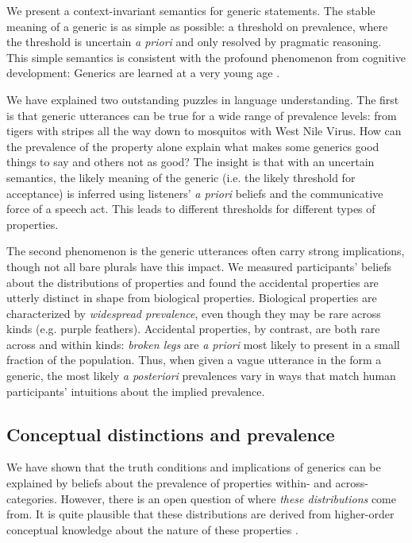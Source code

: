\documentclass[10pt,letterpaper]{article}
\begin{document}

We present a context-invariant semantics for generic statements. 
The stable meaning of a generic is as simple as possible: a threshold on prevalence, where the threshold is uncertain \emph{a priori} and only resolved by pragmatic reasoning.
This simple semantics is consistent with the profound phenomenon from cognitive development: Generics are learned at a very young age \cite{Gelman1998, Gelman2004, Gelman2008, Cimpian2008}.

We have explained two outstanding puzzles in language understanding. 
The first is that generic utterances can be true for a wide range of prevalence levels: from tigers with stripes all the way down to mosquitos with West Nile Virus. 
How can the prevalence of the property alone explain what makes some generics good things to say and others not as good? 
The insight is that with an uncertain semantics, the likely meaning of the generic (i.e. the likely threshold for acceptance) is inferred using listeners' \emph{a priori} beliefs and the communicative force of a speech act. 
This leads to different thresholds for different types of properties. 

The second phenomenon is the generic utterances often carry strong implications, though not all bare plurals have this impact. 
We measured participants' beliefs about the distributions of properties and found the accidental properties are utterly distinct in shape from biological properties.
Biological properties are characterized by \emph{widespread prevalence}, even though they may be rare across kinds (e.g. purple feathers).
Accidental properties, by contrast, are both rare across and within kinds: \emph{broken legs} are \emph{a priori} most likely to present in a small fraction of the population.
Thus, when given a vague utterance in the form a generic, the most likely \emph{a posteriori} prevalences vary in ways that match human participants' intuitions about the implied prevalence.


\subsection{Conceptual distinctions and prevalence}

We have shown that the truth conditions and implications of generics can be explained by beliefs about the prevalence of properties within- and across- categories. 
However, there is an open question of where \emph{these distributions} come from. 
It is quite plausible that these distributions are derived from higher-order conceptual knowledge about the nature of these properties \cite{Gelman2005, Keil1992}.
\end{document}
